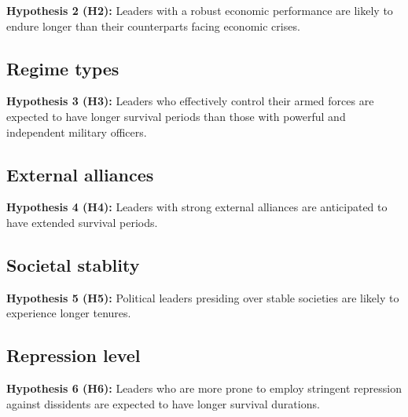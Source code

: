 \documentclass[
  a4paper,
  12pt]{article}
\begin{document}
\textbf{Hypothesis 2 (H2):} Leaders with a robust economic performance
are likely to endure longer than their counterparts facing economic
crises.

\subsection{Regime types}\label{regime-types}

\textbf{Hypothesis 3 (H3):} Leaders who effectively control their armed
forces are expected to have longer survival periods than those with
powerful and independent military officers.

\subsection{External alliances}\label{external-alliances}

\textbf{Hypothesis 4 (H4):} Leaders with strong external alliances are
anticipated to have extended survival periods.

\subsection{Societal stablity}\label{societal-stablity}

\textbf{Hypothesis 5 (H5):} Political leaders presiding over stable
societies are likely to experience longer tenures.

\subsection{Repression level}\label{repression-level}

\textbf{Hypothesis 6 (H6):} Leaders who are more prone to employ
stringent repression against dissidents are expected to have longer
survival durations.

\newpage


\renewcommand\refname{References}
  
\end{document}
